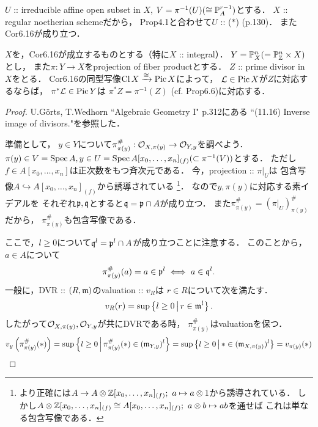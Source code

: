 \documentclass[a4paper]{jsarticle}
\newcommand{\Cl}{\operatorname{Cl}}
\newcommand{\Pic}{\operatorname{Pic}}
\newcommand{\inclmap}{\hookrightarrow} %
\begin{document}
    $U$ :: irreducible affine open subset in $X$, 
    $V=\pi^{-1}(U) (\cong \mathbb{P}_A^{r-1})$とする．
    $X$ :: regular noetherian schemeだから，
    Prop4.1と合わせて$U$ :: ($*$) (p.130)．
    またCor6.16が成り立つ．
    \begin{Claim}
        $X$を，Cor6.16が成立するものとする（特に$X$ :: integral）．
        $Y=\mathbb{P}^n_X(=\mathbb{P}^n_{\mathbb{Z}} \times X)$とし，
        また$\pi: Y \to X$をprojection of fiber productとする．
        $Z$ :: prime divisor in $X$をとる．
        Cor6.16の同型写像$\Cl X \isomap \Pic X$によって，
        $\shL \in \Pic X$が$Z$に対応するならば，
        $\pi^* \shL \in \Pic Y$は
        $\pi^* Z=\pi^{-1}(Z)$ (cf. Prop6.6)に対応する．
    \end{Claim}
    \begin{proof}
        U.G\"orts, T.Wedhorn ``Algebraic Geometry I" p.312にある
        ``(11.16) Inverse image of divisors."を参照した．

        準備として，
        $y \in Y$について$\pi^{\#}_{\pi(y)}: \mathcal{O}_{X, \pi(y)} \to \mathcal{O}_{Y, y}$を調べよう．
        $\pi(y) \in V=\operatorname{Spec} A, y \in U=\operatorname{Spec} A[x_0,\dots,x_n]_{(f)} (\subset \pi^{-1}(V))$とする．
        ただし$f \in A[x_0,\dots,x_n]$は正次数をもつ斉次元である．
        今，projection :: $\pi|_U$は
        包含写像$A \inclmap A[x_0,\dots,x_n]_{(f)}$から誘導されている
        \footnote
        {
            より正確には$A \to A \otimes \mathbb{Z}[x_0,\dots,x_n]_{(f)};~ a \mapsto a \otimes 1$から誘導されている．
            しかし$A \otimes \mathbb{Z}[x_0,\dots,x_n]_{(f)} \cong A[x_0,\dots,x_n]_{(f)};~ a \otimes b \mapsto ab$を通せば
            これは単なる包含写像である．
        }．
        なので$y, \pi(y)$に対応する素イデアルを
        それぞれ$\mathfrak{p}, \mathfrak{q}$とすると$\mathfrak{q}=\mathfrak{p} \cap A$が成り立つ．
        また$\pi^{\#}_{\pi(y)}=(\pi|_U)^{\#}_{\pi(y)}$だから，
        $\pi^{\#}_{\pi(y)}$も包含写像である．

        ここで，$l \geq 0$について$\mathfrak{q}^{l}=\mathfrak{p}^{l} \cap A$が成り立つことに注意する．
        このことから，$a \in A$について
        \[ \pi^{\#}_{\pi(y)}(a)=a \in \mathfrak{p}^{l} \iff a \in \mathfrak{q}^{l}. \]
        一般に，DVR :: $(R, \mathfrak{m})$のvaluation :: $v_R$は
        $r \in R$について次を満たす．
        \[ v_R(r)=\sup \left\{ l \geq 0 \,\middle|\, r \in \mathfrak{m}^l \right\}. \]
        したがって$\mathcal{O}_{X, \pi(y)}, \mathcal{O}_{Y, y}$が共にDVRである時，
        $\pi^{\#}_{\pi(y)}$はvaluationを保つ．
        \[
            v_y \left( \pi^{\#}_{\pi(y)}(*) \right)
            =\sup \left\{ l \geq 0 \,\middle|\, \pi^{\#}_{\pi(y)}(*) \in (\mathfrak{m}_{Y,y})^l \right\}
            =\sup \left\{ l \geq 0 \,\middle|\, * \in (\mathfrak{m}_{X,\pi(y)})^l \right\}
            =v_{\pi(y)}(*)
        \]


\end{proof}
\end{document}

